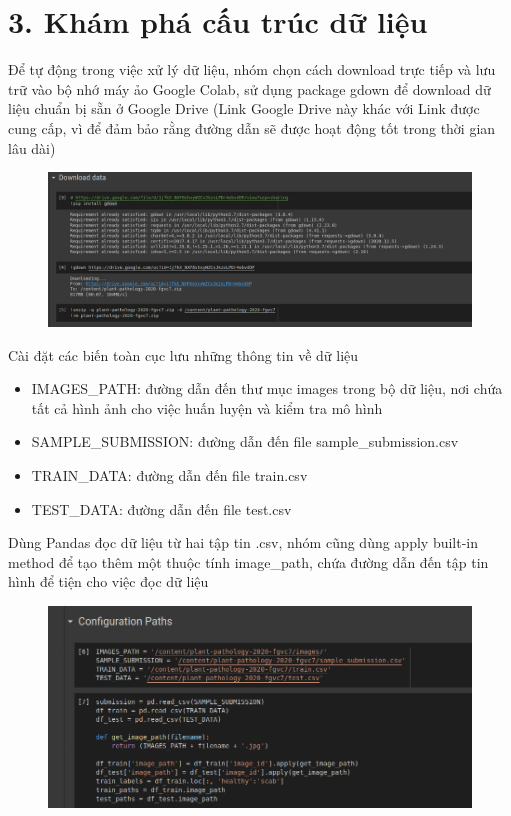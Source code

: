 \documentclass{article}
\begin{document}
	\section{3. Khám phá cấu trúc dữ liệu}
	\qquad Để tự động trong việc xử lý dữ liệu, nhóm chọn cách download trực tiếp và lưu trữ vào bộ nhớ máy ảo Google Colab, sử dụng package gdown để download dữ liệu chuẩn bị sẵn ở Google Drive (Link Google Drive này khác với Link được cung cấp, vì để đảm bảo rằng đường dẫn sẽ được hoạt động tốt trong thời gian lâu dài)
	\begin{figure}[H]
		\centering
		\includegraphics[width=0.75\linewidth]{images/download_plant_pathology_dataset.png}
		\label{fig:writing-thesis}
	\end{figure}
	Cài đặt các biến toàn cục lưu những thông tin về dữ liệu
	\begin{itemize}
		\item IMAGES\_PATH: đường dẫn đến thư mục images trong bộ dữ liệu, nơi chứa tất cả hình ảnh cho việc huấn luyện và kiểm tra mô hình
		\item SAMPLE\_SUBMISSION: đường dẫn đến file sample\_submission.csv
		\item TRAIN\_DATA: đường dẫn đến file train.csv
		\item TEST\_DATA: đường dẫn đến file test.csv
	\end{itemize}
	Dùng Pandas đọc dữ liệu từ hai tập tin .csv, nhóm cũng dùng apply built-in method để tạo thêm một thuộc tính image\_path, chứa đường dẫn đến tập tin hình để tiện cho việc đọc dữ liệu
	\begin{figure}[H]
		\centering
		\includegraphics[width=0.75\linewidth]{images/configuration_paths.png}
		\label{fig:writing-thesis}
	\end{figure}
\end{document}
